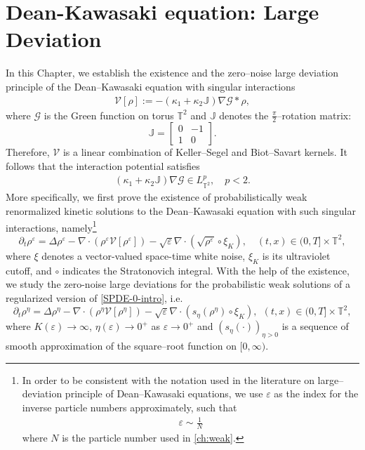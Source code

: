 \chapter{Dean-Kawasaki equation: Large Deviation}\label{ch:LDP}

\newcommand{\Xiaohao}[1]{\textcolor{red}{#1}}
In this Chapter, we establish the existence and the zero--noise large deviation principle of the Dean--Kawasaki equation with singular interactions 
\begin{align}\label{ker-V}
	\mathcal{V}[\rho] := -(\kappa_1 + \kappa_2 \mathbb{J}) \nabla \mathcal{G} \ast \rho,
\end{align}
where $\mathcal{G}$ is the Green function on torus $\mathbb{T}^2$ and $\mathbb{J}$ denotes the $\frac{\pi}{2}$--rotation matrix:
$$
\mathbb{J} = \begin{bmatrix} 0 & -1 \\ 1 & 0 \end{bmatrix}.
$$
Therefore, $\mathcal{V}$ is a linear combination of Keller--Segel and Biot--Savart kernels. It follows that the interaction potential satisfies 
\begin{align}\label{eq:Lp-nablaG}
(\kappa_1 + \kappa_2 \mathbb{J}) \nabla \mathcal{G} \in L^p_{\mathbb{T}^2}, \quad p <2. 
\end{align}
More specifically, we first prove the existence of probabilistically weak renormalized kinetic solutions to the Dean--Kawasaki equation with such singular interactions, namely\footnote{In order to be consistent with the notation used in the literature on large--deviation principle of Dean--Kawasaki equations, we use $\varepsilon$ as the index for the inverse  particle numbers approximately, such that 
\begin{align*}
\varepsilon \sim \frac{1}{N}
\end{align*}
 where $N$ is the particle number used in \ref{ch:weak}.}
\begin{equation}\label{SPDE-0-intro}
\partial_t \rho^{\varepsilon} = \Delta \rho^{\varepsilon} - \nabla \cdot \left(\rho^{\varepsilon} \mathcal{V}[\rho^{\varepsilon}]\right) - \sqrt{\varepsilon} \nabla \cdot (\sqrt{\rho^{\varepsilon}} \circ \xi_K), \quad (t,x) \in (0,T] \times \mathbb{T}^2,
\end{equation}
where $\xi$ denotes a vector-valued space-time white noise, $\xi_K$ is its ultraviolet cutoff, and $\circ$ indicates the Stratonovich integral. 
With the help of the existence, we study the zero-noise large deviations for the probabilistic weak solutions of a regularized version of \eqref{SPDE-0-intro}, i.e.
\begin{equation}\label{SPDE-1}
\partial_t\rho^{\eta}=\Delta\rho^{\eta} - \nabla\cdot(\rho^{\eta}\mathcal{V}[\rho^{\eta}])-\sqrt{\varepsilon}\nabla\cdot(s_{\eta}(\rho^{\eta})\circ\xi_{K}), 	\ \ (t,x)\in(0,T]\times\mathbb{T}^2, 
\end{equation}
where $K(\varepsilon) \to \infty$, $\eta(\varepsilon) \to 0^+$ as $\varepsilon \to 0^+$ and $(s_{\eta}(\cdot))_{\eta > 0}$ is a sequence of smooth approximation of the square--root function on $[0,\infty)$. \\

